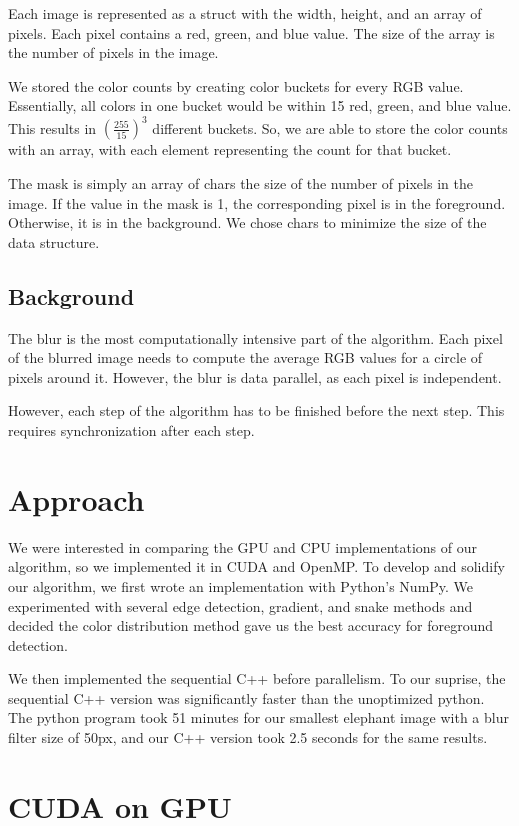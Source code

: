 \documentclass[12pt]{article}
\begin{document}
Each image is represented as a struct with the width, height, and an array of
pixels. Each pixel contains a red, green, and blue value. The size of the array
is the number of pixels in the image.

We stored the color counts by creating color buckets for every RGB value.
Essentially, all colors in one bucket would be within 15 red, green, and blue
value. This results in $\left(\tfrac{255}{15}\right)^3$ different buckets. So,
we are able to store the color counts with an array, with each element
representing the count for that bucket.

The mask is simply an array of chars the size of the number of pixels in the
image. If the value in the mask is 1, the corresponding pixel is in the
foreground. Otherwise, it is in the background. We chose chars to minimize the
size of the data structure.

\subsection{Background}

The blur is the most computationally intensive part of the algorithm. Each
pixel of the blurred image needs to compute the average RGB values for a circle
of pixels around it. However, the blur is data parallel, as each pixel is
independent.

However, each step of the algorithm has to be finished before the next step.
This requires synchronization after each step.

\section{Approach}

We were interested in comparing the GPU and CPU implementations of our
algorithm, so we implemented it in CUDA and OpenMP. To develop and solidify our
algorithm, we first wrote an implementation with Python's NumPy.
We experimented with several edge detection, gradient, and snake methods and
decided the color distribution method gave us the best accuracy for foreground
detection.

We then implemented the sequential C++ before parallelism. To our suprise, the
sequential C++ version was significantly faster than the unoptimized python. The
python program took 51 minutes for our smallest elephant image with a blur
filter size of 50px, and our C++ version took 2.5 seconds for the same results.

\section{CUDA on GPU}
\end{document}
